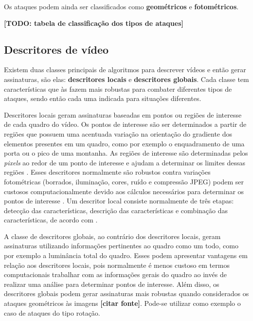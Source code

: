Os ataques podem ainda ser classificados como \textbf{geométricos} e \textbf{fotométricos}.

\textbf{[TODO: tabela de classificação dos tipos de ataques]}

\subsection{Descritores de vídeo}
    
    Existem duas classes principais de algoritmos para descrever vídeos e então gerar assinaturas, são elas: \textbf{descritores locais} e \textbf{descritores globais}. Cada classe tem características que às fazem mais robustas para combater diferentes tipos de ataques, sendo então cada uma indicada para situações diferentes.
    
    Descritores locais geram assinaturas baseadas em pontos ou regiões de interesse de cada quadro do vídeo. Os pontos de interesse são ser determinados a partir de regiões que possuem uma acentuada variação na orientação do gradiente dos elementos presentes em um quadro, como por exemplo o enquadramento de uma porta ou o pico de uma montanha. As regiões de interesse são determinadas pelos \textit{pixels} ao redor de um ponto de interesse e ajudam a determinar os limites dessas regiões \citeauthor{radhakrishnan2007content}. Esses descritores normalmente são robustos contra variações fotométricas (borrados, iluminação, cores, ruído e compressão JPEG) podem ser custosos computacionalmente devido aos cálculos necessários para determinar os pontos de interesse \citeauthor{naini2014vanishing}. Um descritor local consiste normalmente de três etapas: detecção das características, descrição das características e combinação das características, de acordo com \citeauthor{chen2010zernike}.

    A classe de descritores globais, ao contrário dos descritores locais, geram assinaturas utilizando informações pertinentes ao quadro como um todo, como por exemplo a luminância total do quadro. Esses podem apresentar vantagens em relação aos descritores locais, pois normalmente é menos custoso em termos computacionais trabalhar com as informações gerais do quadro ao invés de realizar uma análise para determinar pontos de interesse. Além disso, os descritores globais podem gerar assinaturas mais robustas quando considerados os ataques geométricos às imagens \textbf{[citar fonte]}. Pode-se utilizar como exemplo o caso de ataques do tipo rotação. 
    
